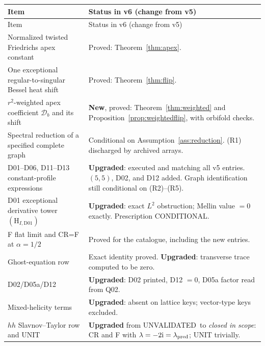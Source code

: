 \documentclass[11pt,a4paper]{article}
\newcommand{\ii}{\mathrm i}
\newcommand{\CONDITIONAL}{\textsf{CONDITIONAL}}
\newcommand{\UNVALIDATED}{\textsf{UNVALIDATED}}
\theoremstyle{plain}
\theoremstyle{definition}
\theoremstyle{remark}
\numberwithin{equation}{section}
\begin{document}
\begingroup
\small
\begin{longtable}{@{}L{.50\linewidth}L{.44\linewidth}@{}}
\toprule
Item & Status in v6 (change from v5)\\
\midrule
\endfirsthead
\toprule
Item & Status in v6 (change from v5)\\
\midrule
\endhead
\bottomrule
\endfoot

Normalized twisted Friedrichs apex constant &
Proved: Theorem~\ref{thm:apex}.\\[3pt]

One exceptional regular-to-singular Bessel heat shift &
Proved: Theorem~\ref{thm:flip}.\\[3pt]

\(r^2\)-weighted apex coefficient \(\mathcal D_b\) and its shift &
\textbf{New}, proved: Theorem~\ref{thm:weighted} and
Proposition~\ref{prop:weightedflip}, with orbifold checks.\\[3pt]

Spectral reduction of a specified complete graph &
Conditional on Assumption~\ref{ass:reduction}.
(R1) discharged by archived arrays.\\[3pt]

D01--D06, D11--D13 constant-profile expressions &
\textbf{Upgraded}: executed and matching all v5 entries.
\((5,5)\), D02, and D12 added.
Graph identification still conditional on (R2)--(R5).\\[3pt]

D01 exceptional derivative tower \((\mathrm H_{I,\mathrm{D01}})\) &
\textbf{Upgraded}: exact \(L^2\) obstruction; Mellin value
\(=0\) exactly.
Prescription \CONDITIONAL.\\[3pt]

F flat limit and CR=F at \(\alpha=1/2\) &
Proved for the catalogue, including the new entries.\\[3pt]

Ghost-equation row &
Exact identity proved.
\textbf{Upgraded}: transverse trace computed to be zero.\\[3pt]

D02/D05a/D12 &
\textbf{Upgraded}: D02 printed, D12 \(=0\), D05a factor read from
Q02.\\[3pt]

Mixed-helicity terms &
\textbf{Upgraded}: absent on lattice keys; vector-type keys
excluded.\\[3pt]

\(hh\) Slavnov--Taylor row and UNIT &
\textbf{Upgraded} from \UNVALIDATED\ to \emph{closed in scope}:
CR and F with \(\lambda=-2\ii=\lambda_{\rm pred}\); UNIT trivially.\\[3pt]


\end{longtable}
\end{document}
